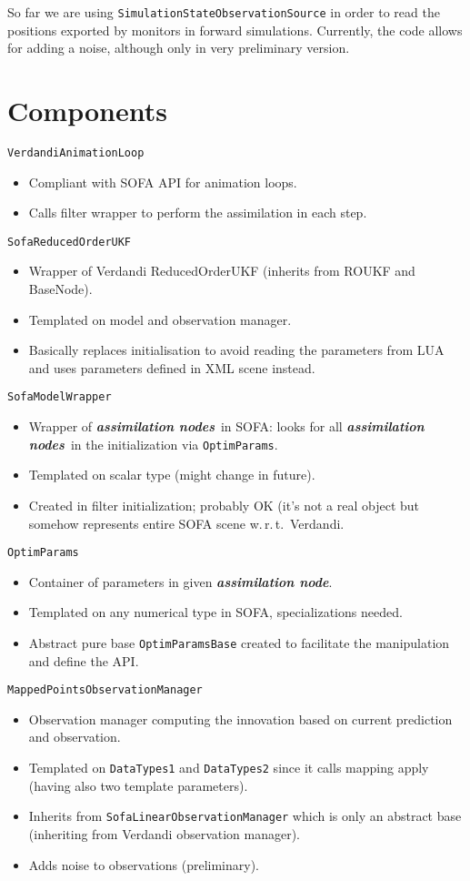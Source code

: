 \documentclass[10pt]{article}
\def\wrt{w.\,r.\,t.}
\def\asn{\textit{\textbf{assimilation node}}}
\def\asns{\textit{\textbf{assimilation nodes}}}
\def\veal{\texttt{VerdandiAnimationLoop}}
\def\sroukf{\texttt{SofaReducedOrderUKF}}
\def\smw{\texttt{SofaModelWrapper}}
\def\opr{\texttt{OptimParams}}
\def\mobs{\texttt{MappedPointsObservationManager}}
\begin{document}
So far we are using \texttt{SimulationStateObservationSource} in order to read the positions exported by monitors in forward simulations. Currently, the code allows for adding a noise, although 
only in very preliminary version.

\section{Components}
{\large \veal}
\begin{itemize}
\item Compliant with SOFA API for animation loops. 
\item Calls filter wrapper to perform the assimilation in each step.
\end{itemize}
\medskip
{\large \sroukf}
\begin{itemize}
\item Wrapper of Verdandi ReducedOrderUKF (inherits from ROUKF and BaseNode).
\item Templated on model and observation manager.
\item Basically replaces initialisation to avoid reading the parameters from LUA and uses parameters defined in XML scene instead. 
\end{itemize}
\medskip
{\large\smw}
\begin{itemize}
\item Wrapper of \asns\ in SOFA: looks for all \asns\ in the initialization via \opr.
\item Templated on scalar type (might change in future).
\item Created in filter initialization; probably OK (it's not a real object but somehow represents entire SOFA scene \wrt\ Verdandi.
\end{itemize}
\medskip
{\large\opr}
\begin{itemize}
\item Container of parameters in given \asn. 
\item Templated on any numerical type in SOFA, specializations needed.
\item Abstract pure base \texttt{OptimParamsBase} created to facilitate the manipulation and define the API.
\end{itemize}
\medskip
{\large\mobs}
\begin{itemize}
\item Observation manager computing the innovation based on current prediction and observation.
\item Templated on \texttt{DataTypes1} and \texttt{DataTypes2} since it calls mapping apply (having also two template parameters).
\item Inherits from \texttt{SofaLinearObservationManager} which is only an abstract base (inheriting from Verdandi observation manager).
\item Adds noise to observations (preliminary).
\end{itemize}
\end{document}

